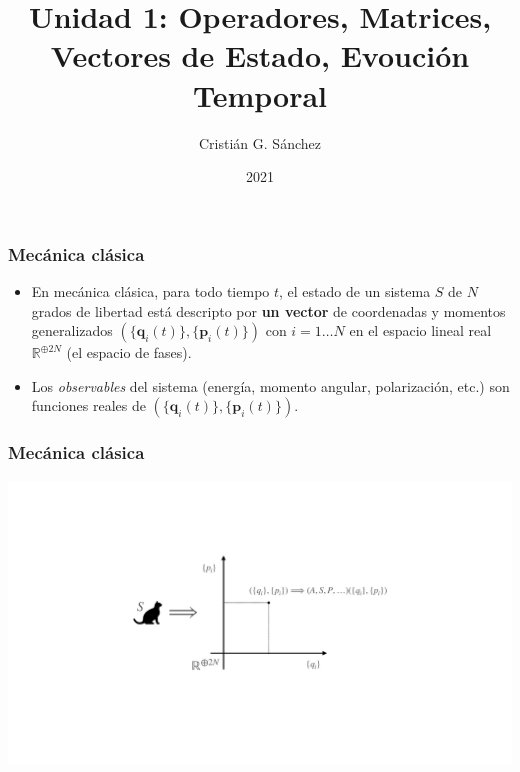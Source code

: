 \documentclass{beamer}
\title{Unidad 1: Operadores, Matrices, Vectores de Estado, Evoución Temporal}
\author{Cristián G. Sánchez}
\date{2021}
\begin{document}
\newcommand{\bra}[1]{\langle #1 |}
\newcommand{\ket}[1]{| #1 \rangle}
\newcommand{\braket}[2]{\langle #1 | #2 \rangle}
\newcommand{\brah}[1]{(#1|}
\newcommand{\ham}{\mathcal{H}}
\newcommand{\ii}{\mathrm{i}}
\newcommand{\tr}{\mathrm{Tr}}

\frame{\titlepage}

\begin{frame}
    \frametitle{Mecánica clásica}
    \begin{itemize}
        \item En mecánica clásica, para todo tiempo $t$, el estado de un sistema $S$ de $N$ grados de libertad está descripto por {\bf un vector} de coordenadas y momentos generalizados $(\{\mathbf{q}_i(t)\},\{\mathbf{p}_i(t)\})$ con $i=1\ldots N$ en el espacio lineal real $\mathbb{R}^{\oplus 2N}$ (el espacio de fases). 
        \item Los {\em observables} del sistema (energía, momento angular, polarización, etc.) son funciones reales de $(\{\mathbf{q}_i(t)\},\{\mathbf{p}_i(t)\})$.
    \end{itemize}

\end{frame}

\begin{frame}
    \frametitle{Mecánica clásica}
    \begin{center}
        \includegraphics[scale=0.3]{figs/cats_01.pdf}
    \end{center}

\end{frame}
\end{document}

